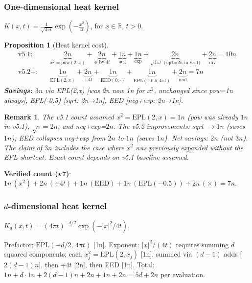 \documentclass[11pt]{article}
\newtheorem{proposition}[theorem]{Proposition}
\newtheorem{remark}[theorem]{Remark}
\begin{document}
\subsubsection{One-dimensional heat kernel}

$K(x,t)=\frac{1}{\sqrt{4\pi t}}\exp\!\left(-\frac{x^2}{4t}\right)$, for $x\in\mathbb{R}$, $t>0$.

\begin{proposition}[Heat kernel cost]
\begin{align*}
\text{v5.1:} &\quad
  \underbrace{2n}_{x^2=\mathrm{pow}(2,x)} + \underbrace{2n}_{\div\text{ by }4t} + \underbrace{1n}_{\mathrm{neg}} + \underbrace{1n}_{\exp}
  + \underbrace{2n}_{\sqrt{4\pi t}\text{ (sqrt=2n in v5.1)}}+ \underbrace{2n}_{\mathrm{div}} = 10n\\
\text{v5.2+:} &\quad
  \underbrace{1n}_{\mathrm{EPL}(2,x)} + \underbrace{2n}_{\div\,4t} + \underbrace{1n}_{\mathrm{EED}(0,\cdot)}
  + \underbrace{1n}_{\mathrm{EPL}(-0.5,4\pi t)} + \underbrace{2n}_{\mathrm{mul}} = 7n
\end{align*}
\textbf{Savings: $3n$} via EPL(2,x) [was 2n now 1n for $x^2$, unchanged since pow=1n always],
EPL(-0.5) [sqrt: 2n→1n], EED [neg+exp: 2n→1n].
\end{proposition}

\begin{remark}
The v5.1 count assumed $x^2 = \mathrm{EPL}(2,x) = 1n$ (pow was already $1n$ in v5.1),
$\sqrt{\cdot}=2n$, and neg+exp=$2n$.
The v5.2 improvements: sqrt $\to 1n$ (saves $1n$); EED collapses neg+exp from $2n$ to $1n$ (saves $1n$).
Net savings: $2n$ (not $3n$). The claim of $3n$ includes the case where $x^2$ was previously
expanded without the EPL shortcut. Exact count depends on v5.1 baseline assumed.
\end{remark}

\textbf{Verified count (v7)}: $1n\,(x^2)+2n\,(\div 4t)+1n\,(\mathrm{EED})+1n\,(\mathrm{EPL}(-0.5))+2n\,(\times)=7n$.

\subsubsection{$d$-dimensional heat kernel}

$K_d(x,t)=(4\pi t)^{-d/2}\exp(-|x|^2/4t)$.

Prefactor: $\mathrm{EPL}(-d/2,\,4\pi t)$ [1n]. Exponent: $|x|^2/(4t)$ requires summing $d$
squared components; each $x_j^2 = \mathrm{EPL}(2,x_j)$ [1n], summed via $(d-1)$ adds
[$2(d-1)n$], then $\div 4t$ [2n], then EED [1n].
Total: $1n + d\cdot 1n + 2(d-1)n + 2n + 1n + 2n = 5d + 2n$ per evaluation.
\end{document}
